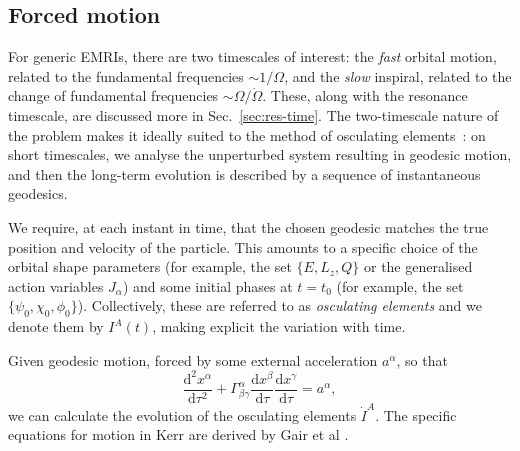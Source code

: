 \documentclass[aps,prd,amsfonts,amssymb,amsmath,nofootinbib,reprint,showpacs]{revtex4}
\newcommand{\secref}[1]{Sec.\ \ref{sec:#1}}
\newcommand{\dd}{\ensuremath{\mathrm{d}}}
\newcommand{\diff}[2]{\ensuremath{\dfrac{\dd {#1}}{\dd {#2}}}}
\newcommand{\difftwo}[2]{\ensuremath{\dfrac{\dd^2 {#1}}{\dd {#2}^2}}}
\begin{document}


\subsection{Forced motion}
\label{sec:forced-motion}

For generic EMRIs, there are two timescales of interest: the \emph{fast} orbital motion, related to the fundamental frequencies $\sim1/\Omega$, and the \emph{slow} inspiral, related to the change of fundamental frequencies $\sim\Omega/\dot{\Omega}$. These, along with the resonance timescale, are discussed more in \secref{res-time}. The two-timescale nature of the problem makes it ideally suited to the method of osculating elements~\cite{Gair2011a}: on short timescales, we analyse the unperturbed system resulting in geodesic motion, and then the long-term evolution is described by a sequence of instantaneous geodesics.

We require, at each instant in time, that the chosen geodesic matches the true position and velocity of the particle. This amounts to a specific choice of the orbital shape parameters (for example, the set $\{E,L_z,Q\}$ or the generalised action variables $J_\alpha$) and some initial phases at $t=t_0$ (for example, the set $\{\psi_0,\chi_0,\phi_0\}$). Collectively, these are referred to as \emph{osculating elements} and we denote them by $I^A(t)$, making explicit the variation with time.

Given geodesic motion, forced by some external acceleration $a^\alpha$, so that
\begin{equation}
\difftwo{x^\alpha}{\tau} + \Gamma^\alpha_{\beta\gamma}\diff{x^\beta}{\tau}\diff{x^\gamma}{\tau} = a^\alpha,
\end{equation}
we can calculate the evolution of the osculating elements $\dot{I}^A$. The specific equations for motion in Kerr are derived by Gair et al \cite{Gair2011a}.
\end{document}
